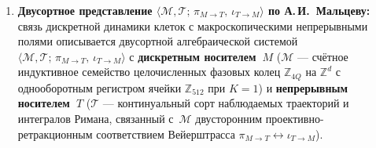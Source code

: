 \begin{theorem}
\begin{enumerate}[label=\textbf{(\arabic*)},leftmargin=*]
\begin{equation}
  \end{equation}
\item \textbf{Двусортное представление $\langle \mathcal{M}, \mathcal{T};\,\pi_{M\to T},\,\iota_{T\to M} \rangle$ по А.\,И.~Мальцеву:}
  связь дискретной динамики клеток с макроскопическими непрерывными полями описывается двусортной алгебраической системой $\langle \mathcal{M}, \mathcal{T};\,\pi_{M\to T},\,\iota_{T\to M} \rangle$ с \textbf{дискретным носителем~$M$} ($\mathcal{M}$ --- счётное индуктивное семейство целочисленных фазовых колец $\mathbb{Z}_{4Q}$ на $\mathbb{Z}^d$ с однооборотным регистром ячейки $\mathbb{Z}_{512}$ при $K=1$) и \textbf{непрерывным носителем~$T$} ($\mathcal{T}$ --- континуальный сорт наблюдаемых траекторий и интегралов Римана, связанный с~$\mathcal{M}$ двусторонним проективно-ретракционным соответствием Вейерштрасса $\pi_{M\to T} \leftrightarrow \iota_{T\to M}$).
\end{enumerate}
\end{theorem}

